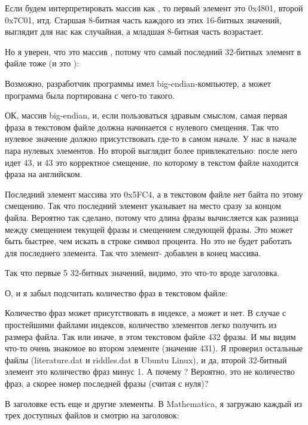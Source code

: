 

Если будем интерпретировать массив как , то первый элемент это 0x4801, второй 0x7C01, итд.
Старшая 8-битная часть каждого из этих 16-битных значений, выглядит для нас как случайная, а младшая 8-битная часть
возрастает.

Но я уверен, что это массив , потому что самый последний 32-битных элемент в файле
тоже  (и это ):



Возможно, разработчик программы  имел big-endian-компьютер, а может программа была портирована с чего-то такого.

ОК, массив big-endian, и, если пользоваться здравым смыслом, самая первая фраза в текстовом файле должна начинается с нулевого
смещения.
Так что нулевое значение должно присутствовать где-то в самом начале.
У нас в начале пара нулевых элементов. Но второй выглядит более привлекательно: после него идет 43, и 43 это корректное
смещение, по которому в текстом файле находится фраза на английском.

Последний элемент массива это 0x5FC4, а в текстовом файле нет байта по этому смещению.
Так что последний элемент указывает на место сразу за концом файла.
Вероятно так сделано, потому что длина фразы вычисляется как разница между смещением текущей фразы
и смещением следующей фразы.
Это может быть быстрее, чем искать в строке символ процента. 
Но это не будет работать для последнего элемента.
Так что элемент- добавлен в конец массива.

Так что первые 5 32-битных значений, видимо, это что-то вроде заголовка.

О, и я забыл подсчитать количество фраз в текстовом файле:



Количество фраз может присутствовать в индексе, а может и нет.
В случае с простейшими файлами индексов, количество элементов легко получить из размера файла.
Так или иначе, в этом текстовом файле 432 фразы.
И мы видим что-то очень знакомое во втором элементе (значение 431).
Я проверил остальные файлы (literature.dat и riddles.dat в Ubuntu Linux), и да, второй 32-битный элемент это
количество фраз минус 1.
А почему ? Вероятно, это не количество фраз, а скорее номер последней фразы (считая с нуля)?

В заголовке есть еще и другие элементы.
В Mathematica, я загружаю каждый из трех доступных файлов и смотрю на заголовок:

